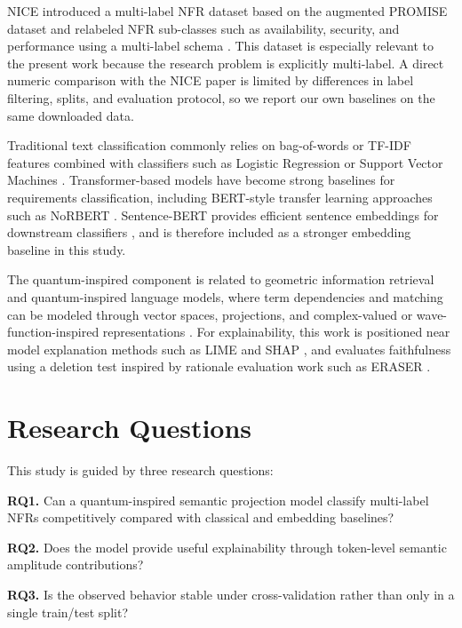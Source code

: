 \documentclass[runningheads]{llncs}
\begin{document}
NICE introduced a multi-label NFR dataset based on the augmented PROMISE dataset
and relabeled NFR sub-classes such as availability, security, and performance
using a multi-label schema \cite{nice_dataset,nice_preprint}. This dataset is
especially relevant to the present work because the research problem is
explicitly multi-label. A direct numeric comparison with the NICE paper is
limited by differences in label filtering, splits, and evaluation protocol, so
we report our own baselines on the same downloaded data.

Traditional text classification commonly relies on bag-of-words or TF-IDF
features combined with classifiers such as Logistic Regression or Support Vector
Machines \cite{sebastiani2002machine}. Transformer-based models have become
strong baselines for requirements classification, including BERT-style transfer
learning approaches such as NoRBERT \cite{devlin2019bert,hey2020norbert}.
Sentence-BERT provides efficient sentence embeddings for downstream classifiers
\cite{reimers2019sentencebert}, and is therefore included as a stronger
embedding baseline in this study.

The quantum-inspired component is related to geometric information retrieval and
quantum-inspired language models, where term dependencies and matching can be
modeled through vector spaces, projections, and complex-valued or
wave-function-inspired representations
\cite{vanrijsbergen2004geometry,sordoni2013quantum,zhang2018quantum,li2019cnm}.
For explainability, this work is positioned near model explanation methods such
as LIME and SHAP \cite{ribeiro2016lime,lundberg2017shap}, and evaluates
faithfulness using a deletion test inspired by rationale evaluation work such
as ERASER \cite{deyoung2020eraser}.

\section{Research Questions}
This study is guided by three research questions:

\textbf{RQ1.} Can a quantum-inspired semantic projection model classify
multi-label NFRs competitively compared with classical and embedding baselines?

\textbf{RQ2.} Does the model provide useful explainability through token-level
semantic amplitude contributions?

\textbf{RQ3.} Is the observed behavior stable under cross-validation rather than
only in a single train/test split?
\end{document}

